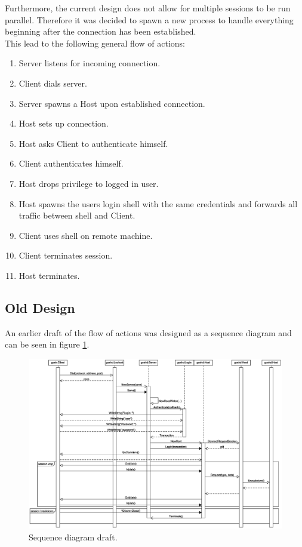 \documentclass[10pt,a4paper,titlepage,twoside,english,final]{zhawreprt}
\begin{document}
Furthermore, the current design does not allow for multiple sessions to be run parallel. Therefore it was decided to spawn a new process to handle everything beginning after the connection has been established.\\
This lead to  the following general flow of actions:

\begin{enumerate}
\item Server listens for incoming connection.
\item Client dials server.
\item Server spawns a Host upon established connection.
\item Host sets up connection.
\item Host asks Client to authenticate himself.
\item Client authenticates himself.
\item Host drops privilege to logged in user.
\item Host spawns the users login \gls{shell} with the same credentials and forwards all traffic between \gls{shell} and Client.
\item Client uses \gls{shell} on remote machine.
\item Client terminates session.
\item Host terminates.
\end{enumerate}

\newpage
\subsection{Old Design}\label{ssec:OldDesign}
An earlier draft of the flow of actions was designed as a sequence diagram and can be seen in figure \ref{fig:SeqDiaOriginal}.
\begin{figure}[ht]
\includegraphics[width=\textwidth]{SequenceDiagram}
\caption{Sequence diagram draft.}
\label{fig:SeqDiaOriginal}
\end{figure}
\end{document}
